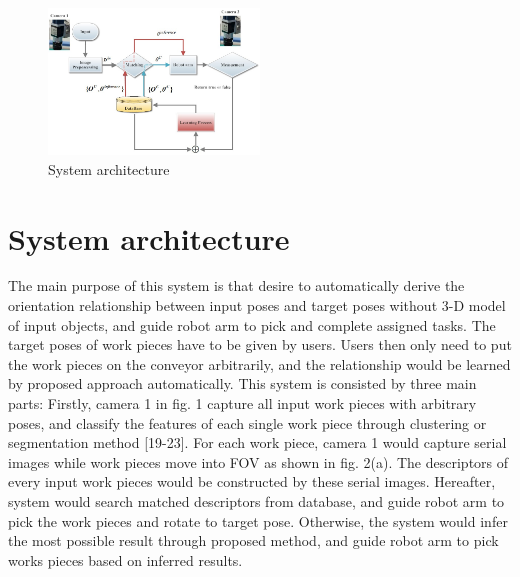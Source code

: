 \documentclass[journal]{IEEEtran}
\begin{document}
\begin{figure}[!t]
\begin{center}
\includegraphics[width=0.5\textwidth]{j_img/fig1.jpg}
\caption{System architecture}\label{test}
\end{center}
\end{figure}




\section{System architecture} 
The main purpose of this system is that desire to automatically derive the orientation relationship between input poses and target poses without 3-D model of input objects, and guide robot arm to pick and complete assigned tasks. The target poses of work pieces have to be given by users. Users then only need to put the work pieces on the conveyor arbitrarily, and the relationship would be learned by proposed approach automatically. This system is consisted by three main parts: Firstly, camera 1 in fig. 1 capture all input work pieces with arbitrary poses, and classify the features of each single work piece through clustering or segmentation method [19-23]. For each work piece, camera 1 would capture serial images while work pieces move into FOV as shown in fig. 2(a). The descriptors of every input work pieces would be constructed by these serial images. Hereafter, system would search matched descriptors from database, and guide robot arm to pick the work pieces and rotate to target pose. Otherwise, the system would infer the most possible result through proposed method, and guide robot arm to pick works pieces based on inferred results. 
\end{document}
